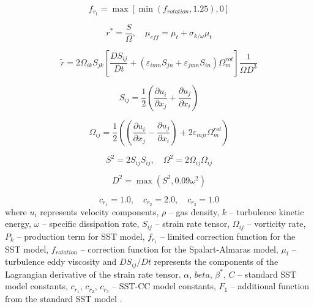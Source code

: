\documentclass[a4paper]{jpconf}
\begin{document}
\begin{figure}[h]
\begin{minipage}{20pc}
\begin{equation}
f_{r_1} = \max\left[ \min(f_{rotation}, 1.25), 0 \right]
\end{equation}

\begin{equation}
r^*=\frac{S}{\Omega}, \quad \mu_{eff}=\mu_t + \sigma_{k/\omega}\mu_t
\end{equation}

\end{minipage}
\end{figure}
\begin{equation}
\tilde{r} = 2\Omega_{ik}S_{jk}\left[ \frac{DS_{ij}}{Dt} + \left( \varepsilon_{imn}S_{jn} + \varepsilon_{jmn}S_{in} \right)\Omega^{rot}_m \right]\frac{1}{\Omega D^3}
\end{equation}

 \begin{equation}
 S_{ij} = \frac{1}{2}\left( \frac{\partial u_i}{\partial x_j} + \frac{\partial u_j}{\partial x_i} \right)
 \end{equation}

\begin{equation}
\Omega_{ij} = \frac{1}{2}\left( \left( \frac{\partial u_i}{\partial x_j} - \frac{\partial u_j}{\partial x_i}  \right) +2\varepsilon_{mji} \Omega^{rot}_m \right)
\end{equation}

\begin{equation}
S^2 = 2S_{ij}S_{ij}, \quad 
\Omega^2 = 2\Omega_{ij}\Omega_{ij}
\end{equation}

\begin{equation}
D^2 = \max(S^2, 0.09\omega^2)
\end{equation}

$$
c_{r_1} = 1.0, \quad c_{r_2} = 2.0, \quad c_{r_3} = 1.0
$$
 where $u_i$ represents velocity components, $\rho$ -- gas density, $k$ -- turbulence kinetic energy, $\omega$ -- specific dissipation rate, $S_{ij}$ -- strain rate tensor, $\Omega_{ij}$ -- vorticity rate, $P_k$ -- production term for SST model, $f_{r_1}$ -- limited correction function for the SST model, $f_{rotation}$ -- correction function for the Spalart-Almaras model, $\mu_{t}$ -- turbulence eddy viscosity and $DS_{ij}/Dt$ represents the components of the Lagrangian derivative of the strain rate tensor. $\alpha$, $beta$, $\beta^*$, $C$ -- standard SST model constants, $c_{r_1}$, $c_{r_2}$, $c_{r_3}$ -- SST-CC model constants, $F_1$ -- additional function from the standard SST model \cite{Menter}.
\end{document}

